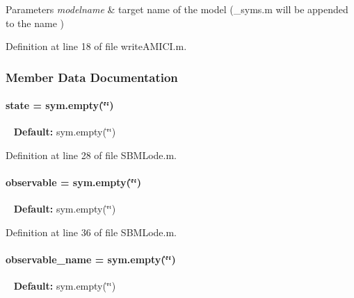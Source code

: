 \begin{DoxyParams}{Parameters}
{\em modelname} & target name of the model (\+\_\+syms.\+m will be appended to the name ) \\
\hline
\end{DoxyParams}


Definition at line 18 of file write\+A\+M\+I\+C\+I.\+m.



\subsubsection{Member Data Documentation}
\hypertarget{class_s_b_m_lode_adc6e5733fc3c22f0a7b2914188c49c90}{}
\paragraph[{state}]{\setlength{\rightskip}{0pt plus 5cm}state = sym.\+empty(\char`\"{}\char`\"{})}\label{class_s_b_m_lode_adc6e5733fc3c22f0a7b2914188c49c90}
~\newline
{\bfseries Default\+:} sym.\+empty(\char`\"{}\char`\"{}) 

Definition at line 28 of file S\+B\+M\+Lode.\+m.

\hypertarget{class_s_b_m_lode_a072b6f6192ac4f40e74b69f901ecdfef}{}
\paragraph[{observable}]{\setlength{\rightskip}{0pt plus 5cm}observable = sym.\+empty(\char`\"{}\char`\"{})}\label{class_s_b_m_lode_a072b6f6192ac4f40e74b69f901ecdfef}
~\newline
{\bfseries Default\+:} sym.\+empty(\char`\"{}\char`\"{}) 

Definition at line 36 of file S\+B\+M\+Lode.\+m.

\hypertarget{class_s_b_m_lode_a6e638e3379dc2d099b3cf3083246fbe0}{}
\paragraph[{observable\+\_\+name}]{\setlength{\rightskip}{0pt plus 5cm}observable\+\_\+name = sym.\+empty(\char`\"{}\char`\"{})}\label{class_s_b_m_lode_a6e638e3379dc2d099b3cf3083246fbe0}
~\newline
{\bfseries Default\+:} sym.\+empty(\char`\"{}\char`\"{}) 

